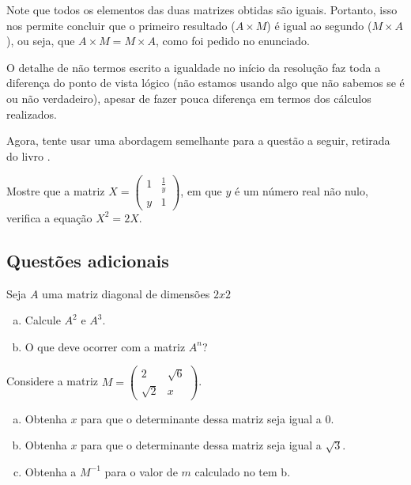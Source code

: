 \documentclass[main.tex]{subfiles}
\begin{document}
Note que todos os elementos das duas matrizes obtidas são iguais. Portanto, isso nos permite concluir que o primeiro resultado ($A \times M$) é igual ao segundo ($M \times A$), ou seja, que $A \times M = M \times A$, como foi pedido no enunciado.

O detalhe de não termos escrito a igualdade no início da resolução faz toda a diferença do ponto de vista lógico (não estamos usando algo que não sabemos se é ou não verdadeiro), apesar de fazer pouca diferença em termos dos cálculos realizados.

Agora, tente usar uma abordagem semelhante para a questão a seguir, retirada do livro .

\begin{resolva}
Mostre que a matriz $X = \begin{pmatrix}1 & \frac{1}{y} \\ y & 1\end{pmatrix}$, em que $y$ é um número real não nulo, verifica a equação $X^2 = 2X$.
\end{resolva}

\paraTutores

\subsection{Questões adicionais}

\begin{adicional}
Seja $A$ uma matriz diagonal de dimensões $2x2$
\begin{enumerate}[a)]
\item Calcule $A^2$ e $A^3$.
\item O que deve ocorrer com a matriz $A^n$?
\end{enumerate}
\end{adicional}


\begin{adicional}
Considere a matriz $M=\begin{pmatrix}2 & \sqrt{6} \\ \sqrt{2} & x\end{pmatrix}$.
\begin{enumerate}[a)]
\item Obtenha $x$ para que o determinante dessa matriz seja igual a $0$.
\item Obtenha $x$ para que o determinante dessa matriz seja igual a $\sqrt{3}$.
\item Obtenha a $M^{-1}$ para o valor de $m$ calculado no tem b.
\end{enumerate}
\end{adicional}
\end{document}
